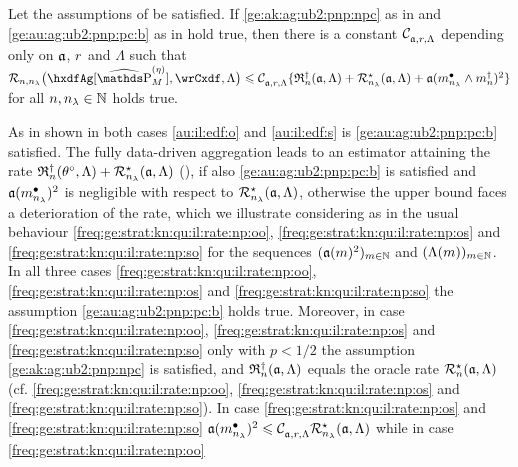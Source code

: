 \begin{cor}\label{au:mrb:ag:ub2:pnp}
  Let the assumptions of  be satisfied.
    If  \ref{ge:ak:ag:ub2:pnp:npc} as in  and \ref{ge:au:ag:ub2:pnp:pc:b}
    as in  hold true, then there is a constant $\cst{\xdfCw[],\xdfCr,\Lambda}$ depending
    only on $\xdfCw[]$, $\xdfCr$ and $\Lambda$ such that $\nmRi{\hxdfAg[{\erWe[]}]}{\rwCxdf,\Lambda}
    \leq \cst{\xdfCw[],\xdfCr,\Lambda}\{\naRa{(\xdfCw[],\Lambda)}+\mmRa{\xdfCw[],\Lambda}+\xdfCw[(\sDi{\ssE}\wedge\aDi{\ssY})]^2\}$ for all $\ssY,\ssE\in\Nz$ holds true.
\end{cor}
\begin{il}\label{au:mrb:ag:ub:pnp:il} As in 
  shown in both cases \ref{au:il:edf:o} and \ref{au:il:edf:s} is
  \ref{ge:au:ag:ub2:pnp:pc:b} satisfied.  The fully data-driven
  aggregation
  leads to an estimator attaining
  the rate $\naRa{(\xdf,\Lambda)}+\mmRa{\xdfCw[],\Lambda}$ (),
  if also  \ref{ge:au:ag:ub2:pnp:pc:b} is satisfied and
  $\xdfCw[(\sDi{\ssE})]^2$ is negligible with
  respect to $\mmRa{\xdfCw[],\Lambda}$, otherwise the upper
  bound faces a deterioration of the rate, which we illustrate
  considering as in  the usual behaviour
  \ref{freq:ge:strat:kn:qu:il:rate:np:oo}, \ref{freq:ge:strat:kn:qu:il:rate:np:os} and
  \ref{freq:ge:strat:kn:qu:il:rate:np:so} for the sequences
  $\Nsuite[\Di]{\xdfCw[(\Di)]^2}$ and $\Nsuite[\Di]{\iSv[\Di]}$.
  In all three cases \ref{freq:ge:strat:kn:qu:il:rate:np:oo}, \ref{freq:ge:strat:kn:qu:il:rate:np:os} and
  \ref{freq:ge:strat:kn:qu:il:rate:np:so} the assumption \ref{ge:au:ag:ub2:pnp:pc:b}
  holds true. Moreover, in case \ref{freq:ge:strat:kn:qu:il:rate:np:oo},
  \ref{freq:ge:strat:kn:qu:il:rate:np:os} and \ref{freq:ge:strat:kn:qu:il:rate:np:so} only with
  $p<1/2$ the assumption \ref{ge:ak:ag:ub2:pnp:npc} is satisfied, and
  $\naRa{(\xdfCw[],\Lambda)}$ equals the oracle rate $\mnRa{\xdfCw[],\Lambda}$ (cf.
   \ref{freq:ge:strat:kn:qu:il:rate:np:oo},
  \ref{freq:ge:strat:kn:qu:il:rate:np:os} and \ref{freq:ge:strat:kn:qu:il:rate:np:so}). In case
  \ref{freq:ge:strat:kn:qu:il:rate:np:os} and \ref{freq:ge:strat:kn:qu:il:rate:np:so}
  $\xdfCw[(\sDi{\ssE})]^2\leq \cst{\xdfCw[],\xdfCr,\Lambda} \mmRa{\xdfCw[],\Lambda}$ while
  in case \ref{freq:ge:strat:kn:qu:il:rate:np:oo}

\end{il}
